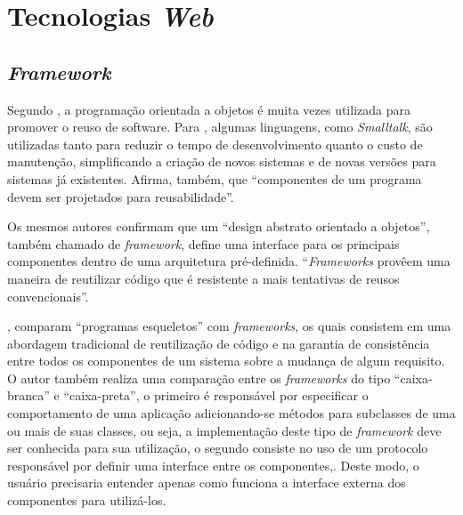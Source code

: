 \chapter{Tecnologias \textit{Web}}

\section{\textit{Framework}}
Segundo , a programação orientada a objetos é muita vezes utilizada para promover o reuso de software. Para , algumas linguagens, como \textit{Smalltalk}, são utilizadas tanto para reduzir o tempo de desenvolvimento quanto o custo de manutenção, simplificando a criação de novos sistemas e de novas versões para sistemas já existentes. Afirma, também, que ``componentes de um programa devem ser projetados para reusabilidade''.

Os mesmos autores confirmam que um ``design abstrato orientado a objetos'', também chamado de \textit{framework}, define uma interface para os principais componentes dentro de uma
arquitetura pré-definida. ``\textit{Frameworks} provêem uma maneira de reutilizar código que é resistente a mais tentativas de reusos convencionais''.

, comparam ``programas esqueletos'' com \textit{frameworks}, os quais consistem em uma abordagem tradicional de reutilização de código e na garantia de consistência entre todos os componentes de um sistema sobre a mudança de algum requisito. O autor também realiza uma comparação entre os \textit{frameworks} do tipo ``caixa-branca'' e ``caixa-preta'', o primeiro é responsável por especificar o comportamento de uma aplicação adicionando-se métodos para subclasses de uma ou mais de suas classes, ou seja, a implementação deste tipo de \textit{framework} deve ser conhecida para sua utilização, o segundo consiste no uso de um protocolo responsável por definir uma interface entre os componentes,. Deste modo, o usuário precisaria entender apenas como funciona a interface externa dos componentes para utilizá-los.

